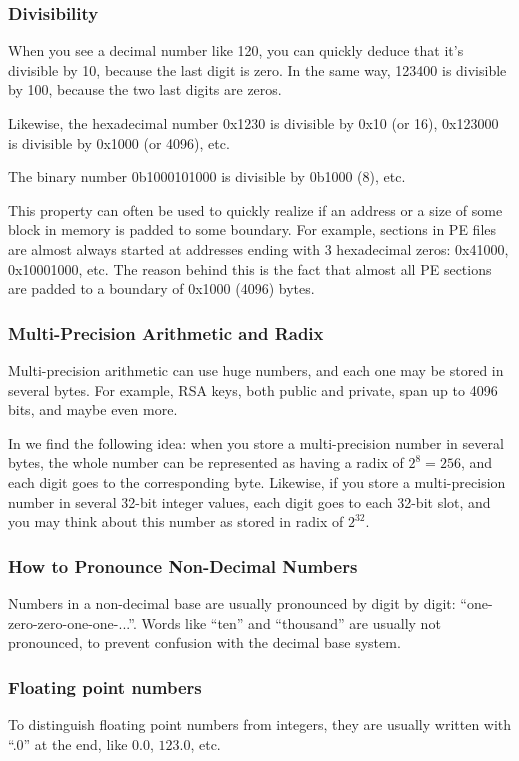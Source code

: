 \subsubsection{Divisibility}

When you see a decimal number like 120, you can quickly deduce that it's divisible by 10, because the last digit is zero.
In the same way, 123400 is divisible by 100, because the two last digits are zeros.

Likewise, the hexadecimal number 0x1230 is divisible by 0x10 (or 16), 0x123000 is divisible by 0x1000 (or 4096), etc.

The binary number 0b1000101000 is divisible by 0b1000 (8), etc.

This property can often be used to quickly realize if an address or a size of some block in memory is padded to some boundary.
For example, sections in \ac{PE} files are almost always started at addresses ending with 3 hexadecimal zeros: 0x41000, 0x10001000, etc.
The reason behind this is the fact that almost all \ac{PE} sections are padded to a boundary of 0x1000 (4096) bytes.

\subsubsection{Multi-Precision Arithmetic and Radix}

Multi-precision arithmetic can use huge numbers, and each one may be stored in several bytes.
For example, RSA keys, both public and private, span up to 4096 bits, and maybe even more.

In  we find the following idea: when you store a multi-precision number in several bytes,
the whole number can be represented as having a radix of $2^8=256$, and each digit goes to the corresponding byte.
Likewise, if you store a multi-precision number in several 32-bit integer values, each digit goes to each 32-bit slot,
and you may think about this number as stored in radix of $2^{32}$.

\subsubsection{How to Pronounce Non-Decimal Numbers}

Numbers in a non-decimal base are usually pronounced by digit by digit: ``one-zero-zero-one-one-...''.
Words like ``ten'' and ``thousand'' are usually not pronounced, to prevent confusion with the decimal base system.

\subsubsection{Floating point numbers}

To distinguish floating point numbers from integers, they are usually written with ``.0'' at the end,
like $0.0$, $123.0$, etc.
